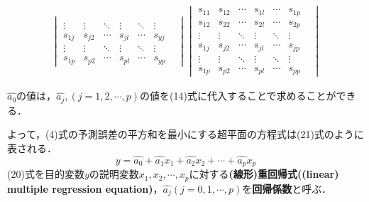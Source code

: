 \documentclass[dvipdfmx]{jsarticle}
\begin{document}
\begin{equation}
\begin{array}{c}
{\begin{vmatrix}
        \\
        \vdots  &
        \vdots  &
        \ddots  &
        \vdots  &
        \ddots  &
        \vdots  &
        \\
        s_{1j}  &
        s_{j2}  &
        \cdots  &
        s_{jl}  &
        \cdots  &
        s_{yj}    \\
        \vdots  &
        \vdots  &
        \ddots  &
        \vdots  &
        \ddots  &
        \vdots  &
        \\
        s_{1p}  &
        s_{p2 } &
        \cdots  &
        s_{pl}  &
        \cdots  &
        s_{yp}
      \end{vmatrix}
    }{
      \begin{vmatrix}
        s_{11}  &
        s_{12 } &
        \cdots  &
        s_{1l}  &
        \cdots  &
        s_{1p}
        \\
        s_{12}  &
        s_{22 } &
        \cdots  &
        s_{2l}  &
        \cdots  &
        s_{2p}
        \\
        \vdots  &
        \vdots  &
        \ddots  &
        \vdots  &
        \ddots  &
        \vdots  &
        \\
        s_{1j}  &
        s_{j2}  &
        \cdots  &
        s_{jl}  &
        \cdots  &
        s_{jp}    \\
        \vdots  &
        \vdots  &
        \ddots  &
        \vdots  &
        \ddots  &
        \vdots  &
        \\
        s_{1p}  &
        s_{p2 } &
        \cdots  &
        s_{pl}  &
        \cdots  &
        s_{pp}
      \end{vmatrix}
    }
  \end{array}
\end{equation}

$\hat{a_0}$の値は，$\hat{a_j},(j=1,2,\cdots, p)$の値を(14)式に代入することで求めることができる．
\\
\par
よって，(4)式の予測誤差の平方和を最小にする超平面の方程式は(21)式のように表される．
\begin{equation}
  y = \hat{a_0}+\hat{a_1}x_1+\hat{a_2}x_2+\cdots+\hat{a_p}x_p
\end{equation}
(20)式を目的変数$y$の説明変数$x_1,x_2,\cdots, x_p$に対する\textbf{(線形)重回帰式((linear) multiple regression equation)}，$\hat{a_j}(j=0,1,\cdots,p)$を\textbf{回帰係数}と呼ぶ．
\par
\  
\end{document}
